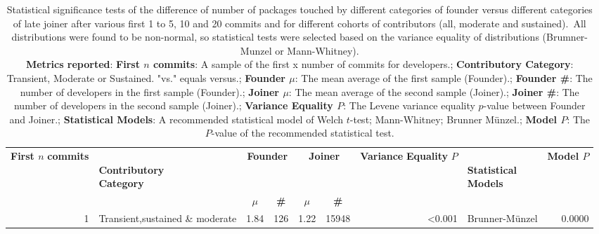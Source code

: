 \begin{table}[H]
\centering
\setlength{\tabcolsep}{2pt}
\caption[Statistical Significance Normality and Variance tests for packages for different categories of founder versus different categories of late joiner  for 1 to 5, 10 and 20]{Statistical significance tests of the difference of number of packages touched by different categories of founder versus different categories of late joiner  after various first 1 to 5, 10 and 20 commits and for different cohorts of contributors (all, moderate and sustained). All distributions were found to be non-normal, so statistical tests were selected based on the variance equality of distributions (Brumner-Munzel or Mann-Whitney). \\ \textbf{Metrics reported}:   \textbf{First $n$ commits}: A sample of the first x number of commits for developers.;  \textbf{Contributory Category}: Transient, Moderate or Sustained. "vs." equals versus.;  \textbf{Founder $\mu$}: The mean average of the first sample (Founder).;  \textbf{Founder \#}: The number of developers in the first sample (Founder).;  \textbf{Joiner $\mu$}: The mean average of the second sample (Joiner).;  \textbf{Joiner \#}: The number of developers in the second sample (Joiner).;  \textbf{Variance Equality $P$}: The Levene variance equality $p$-value between Founder and Joiner.;  \textbf{Statistical Models}: A recommended statistical model of Welch $t$-test; Mann-Whitney; Brunner Münzel.;  \textbf{Model $P$}: The $P$-value of the recommended statistical test.
}
\begin{tabular}{r p{4cm} c c c c r l r}
\toprule
\makecell[t]{\textbf{First $n$}\\\textbf{commits}} & \makecell[t]{\textbf{}\\\textbf{Contributory}\\\textbf{Category}} & \multicolumn{2}{c}{\textbf{Founder}} & \multicolumn{2}{c}{\textbf{Joiner}} & \makecell[t]{\textbf{Variance}\\\textbf{Equality}\\\textbf{$P$}} & \makecell[t]{\textbf{}\\\textbf{Statistical}\\\textbf{Models}} & \textbf{Model $P$} \\ 
\cmidrule(lr){3-4} \cmidrule(lr){5-6}
 &  & \textbf{$\mu$} & \textbf{\#} & \textbf{$\mu$} & \textbf{\#} &  &  &  \\ 
\midrule
1 & Transient,sustained \& moderate &  1.84 & 126 & 1.22 & 15948 & \textless 0.001 &  Brunner-Münzel & 0.0000 \\ 

\end{tabular}
\end{table}
